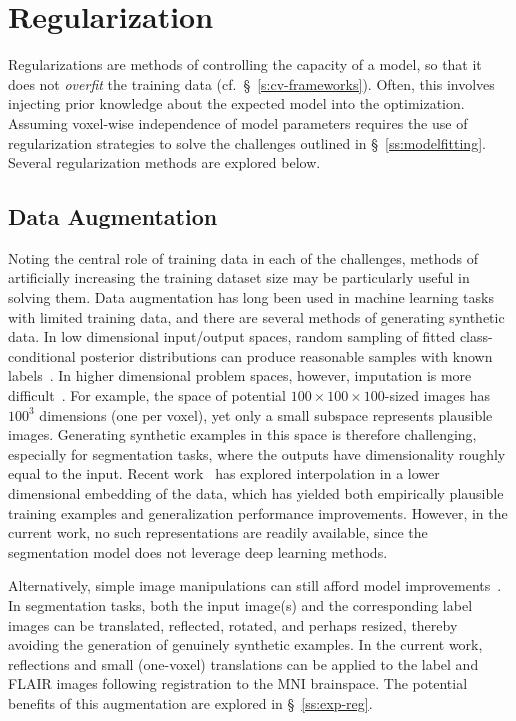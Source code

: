 \section{Regularization}\label{s:vlr-reg}
Regularizations are methods of controlling the capacity of a model,
so that it does not \textit{overfit} the training data (cf.~\S~\ref{s:cv-frameworks}).
Often, this involves injecting prior knowledge about the expected model into the optimization.
Assuming voxel-wise independence of model parameters requires the use of regularization strategies
to solve the challenges outlined in \S~\ref{ss:modelfitting}.
Several regularization methods are explored below.
\subsection{Data Augmentation}\label{ss:vlr-reg-aug}
Noting the central role of training data in each of the challenges,
methods of artificially increasing the training dataset size
may be particularly useful in solving them.
Data augmentation has long been used in machine learning tasks with limited training data,
and there are several methods of generating synthetic data.
In low dimensional input/output spaces,
random sampling of fitted class-conditional posterior distributions
can produce reasonable samples with known labels~\cite{Tanner1987}.
In higher dimensional problem spaces, however, imputation is more difficult~\cite{Goodfellow2014}.
For example, the space of potential $100\times100\times100$-sized images has $100^3$ dimensions
(one per voxel), yet only a small subspace represents plausible images.
Generating synthetic examples in this space is therefore challenging,
especially for segmentation tasks,
where the outputs have dimensionality roughly equal to the input.
Recent work~\cite{Devries2017,Zhang2017} has explored interpolation
in a lower dimensional embedding of the data,
which has yielded both empirically plausible training examples
and generalization performance improvements.
However, in the current work, no such representations are readily available,
since the segmentation model does not leverage deep learning methods.
\par
Alternatively, simple image manipulations can still afford model improvements~\cite{Krizhevsky2012}.
In segmentation tasks, both the input image(s) and the corresponding label images can be
translated, reflected, rotated, and perhaps resized,
thereby avoiding the generation of genuinely synthetic examples.
In the current work, reflections and small (one-voxel) translations
can be applied to the label and FLAIR images following registration to the MNI brainspace.
The potential benefits of this augmentation are explored in \S~\ref{ss:exp-reg}.

